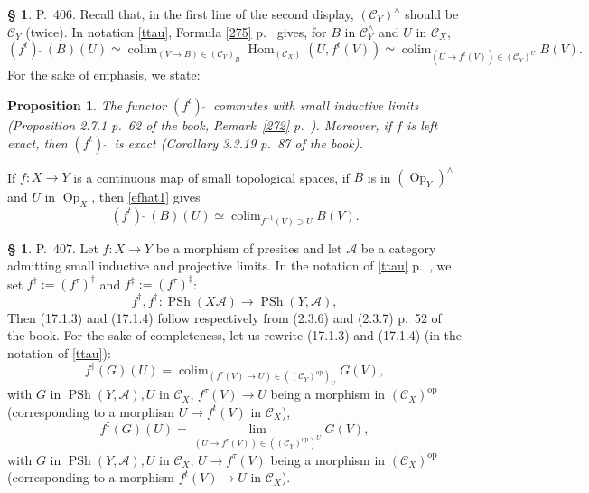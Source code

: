 \documentclass[12pt]{article}%
\newtheorem{prop}[thm]{Proposition}
\theoremstyle{remark}
\theoremstyle{definition}
\newtheorem{s}[thm]{\S}%
\newcommand{\oo}{\operatorname}
\newcommand{\A}{\mathcal A}
\newcommand{\C}{\mathcal C}
\newcommand{\fthat}{(f^t)\ \widehat{}\ }
\DeclareMathOperator*{\colim}{colim}%
\DeclareMathOperator{\Hom}{Hom}%
\DeclareMathOperator{\op}{op}
\DeclareMathOperator{\PSh}{PSh}
\begin{document}
\begin{s}\label{fhat}
P.~406. Recall that, in the first line of the second display, $(\C_Y)^\wedge$ should be $\C_Y$ (twice). In notation \eqref{ttau}, Formula \eqref{275} p.~\pageref{275} gives, for $B$ in $\C_Y^\wedge$ and $U$ in $\C_X$, 
%
\begin{equation}\label{efhat1}
\fthat(B)(U)\simeq\colim_{(V\to B)\in(\C_Y)_B}\Hom_{(\C_X)}(U,f^t(V))\simeq\colim_{(U\to f^t(V))\in(\C_Y)^U}B(V).
\end{equation}
%
For the sake of emphasis, we state: 

\begin{prop}\label{p406}
The functor $\fthat$ commutes with small inductive limits (Proposition 2.7.1 p.~62 of the book, Remark~\ref{272} p.~\pageref{272}). Moreover, if $f$ is left exact, then $\fthat$ is exact (Corollary 3.3.19 p.~87 of the book).
\end{prop}

If $f:X\to Y$ is a continuous map of small topological spaces, if $B$ is in $(\oo{Op}_Y)^\wedge$ and $U$ in $\oo{Op}_X$, then \eqref{efhat1} gives 
%
\begin{equation}\label{efhat2}
\fthat(B)(U)\simeq\colim_{f^{-1}(V)\supset U}B(V).
\end{equation}
%
\end{s}

%

\begin{s}\label{fdagger} 
P.~407. Let $f:X\to Y$ be a morphism of presites and let $\A$ be a category admitting small inductive and projective limits. In the notation of \eqref{ttau} p.~\pageref{ttau}, we set $f^\dagger:=(f^\tau)^\dagger$ and $f^\ddagger:=(f^\tau)^\ddagger$: 
$$
f^\dagger,f^\ddagger:\PSh(X\A)\to\PSh(Y,\A),
$$
Then (17.1.3) and (17.1.4) follow respectively from (2.3.6) and (2.3.7) p.~52 of the book. For the sake of completeness, let us rewrite (17.1.3) and (17.1.4) (in the notation of \eqref{ttau}):
%
\begin{equation}\label{1713}
f^\dagger(G)(U)=\colim_{(f^\tau(V)\to U)\in((\C_Y)^{\op})_U}G(V),
\end{equation}
%
with $G$ in $\PSh(Y,\A),U$ in $\C_X$, $f^\tau(V)\to U$ being a morphism in $(\C_X)^{\op}$ (corresponding to a morphism $U\to f^t(V)$ in $\C_X$), 
%
\begin{equation}\label{1714}
f^\ddagger(G)(U)=\lim_{(U\to f^\tau(V))\in((\C_Y)^{\op})^U}G(V),
\end{equation}
%
with $G$ in $\PSh(Y,\A),U$ in $\C_X$, $U\to f^\tau(V)$ being a morphism in $(\C_X)^{\op}$ (corresponding to a morphism $f^t(V)\to U$ in $\C_X$).
\end{s}
\end{document}
